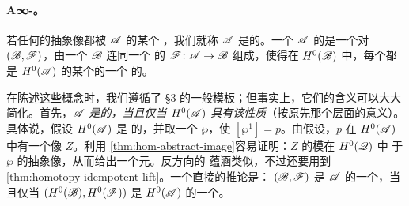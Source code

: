 \paragraph{\trSplitClosed{} A∞-\trCategory。}\label{sub:split-closed-categories}
若任何\trHomotopy\trIdempotent{}的抽象像都被 $\mathscr{A}$ 的某个\trObject{}%
\trQuasiRepresent，我们就称 $\mathscr{A}$ 是\trSplitClosed{}的。一个%
\trACategory{} $\mathscr{A}$ 的\trSplitClosure{}是一个对 $(\mathscr{B},\mathscr{F})$，由一个%
\trSplitClosed{} \trACategory{} $\mathscr{B}$ 连同一个\trCohomology%
\trFullyFaithful{}的\trFunctor{} $\mathscr{F}\colon\mathscr{A}\to\mathscr{B}$ 组成，使得在
$H^0(\mathscr{B})$ 中，每个\trObject{}都是 $H^0(\mathscr{A})$ 的某个\trObject{}的一个%
\trIdempotent{}\trEndomorphism{}的\trImage。

在陈述这些概念时，我们遵循了 §3 的一般模板；但事实上，它们的含义可以大大
简化。首先，$\mathscr{A}$ \emph{是\trSplitClosed{}的，当且仅当 $H^0(\mathscr{A})$
具有该性质}（按原先那个\trCohomology{}层面的意义）。具体说，假设 $H^0(\mathscr{A})$ 是%
\trSplitClosed{}的，并取一个\trHomotopy\trIdempotent{} $\wp$，使
$[\wp^1]=p$。由假设，$p$ 在 $H^0(\mathscr{A})$ 中有一个像 $Z$。利用%
\cref{thm:hom-abstract-image}容易证明：$Z$ 的\trYoneda{}模在 $H^0(\mathscr{Q})$ 中%
\trIsomorphic{}于 $\wp$ 的抽象像，从而给出一个\trQuasiRepresent{}元。反方向的
蕴涵类似，不过还要用到\cref{thm:homotopy-idempotent-lift}。一个直接的推论是：
$(\mathscr{B},\mathscr{F})$ 是 $\mathscr{A}$ 的一个\emph{\trSplitClosure}，当且仅当
$(H^0(\mathscr{B}),H^0(\mathscr{F}))$ 是 $H^0(\mathscr{A})$ 的一个\trSplitClosure。

